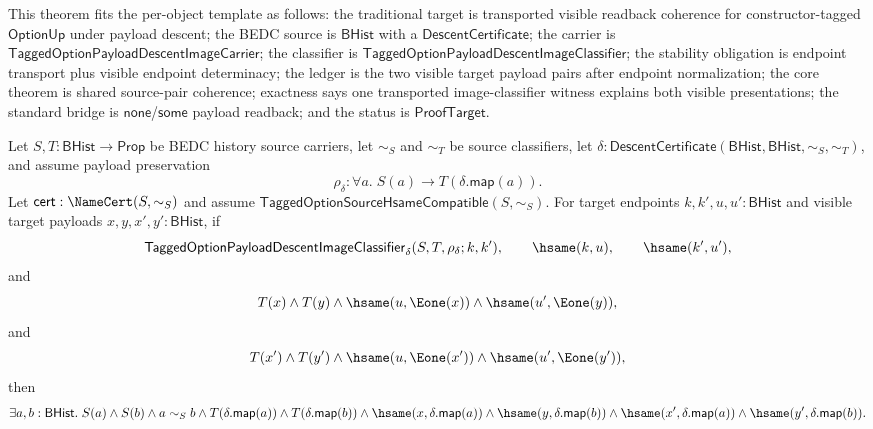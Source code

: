 \begin{theorem}
\label{thm:tagged-option-payload-descent-image-classifier-transported-visible-payload-pair-coherence}
This theorem fits the per-object template as follows: the traditional target is
transported visible readback coherence for constructor-tagged
$\mathsf{OptionUp}$ under payload descent; the BEDC source is $\mathsf{BHist}$
with a $\mathsf{DescentCertificate}$; the carrier is
$\mathsf{TaggedOptionPayloadDescentImageCarrier}$; the classifier is
$\mathsf{TaggedOptionPayloadDescentImageClassifier}$; the stability obligation
is endpoint transport plus visible endpoint determinacy; the ledger is the two
visible target payload pairs after endpoint normalization; the core theorem is
shared source-pair coherence; exactness says one transported image-classifier
witness explains both visible presentations; the standard bridge is
$\mathsf{none}$/$\mathsf{some}$ payload readback; and the status is
$\mathsf{ProofTarget}$.

Let $S,T:\mathsf{BHist}\to\mathsf{Prop}$ be BEDC history source carriers, let
$\sim_S$ and $\sim_T$ be source classifiers, let
$\delta:\mathsf{DescentCertificate}(\mathsf{BHist},\mathsf{BHist},\sim_S,\sim_T)$,
and assume payload preservation
$$
\rho_{\delta}:\forall a.\;S(a)\to T(\delta.\mathsf{map}(a)).
$$
Let $\mathsf{cert}:\NameCert(S,\sim_S)$ and assume
$\mathsf{TaggedOptionSourceHsameCompatible}(S,\sim_S)$. For target endpoints
$k,k',u,u':\mathsf{BHist}$ and visible target payloads
$x,y,x',y':\mathsf{BHist}$, if
$$
\mathsf{TaggedOptionPayloadDescentImageClassifier}_{\delta}
(S,T,\rho_{\delta};k,k'),
\qquad
\hsame(k,u),
\qquad
\hsame(k',u'),
$$
and
$$
T(x)\land T(y)\land
\hsame(u,\Eone(x))\land
\hsame(u',\Eone(y)),
$$
and
$$
T(x')\land T(y')\land
\hsame(u,\Eone(x'))\land
\hsame(u',\Eone(y')),
$$
then
$$
\exists a,b:\mathsf{BHist}.\;
S(a)\land S(b)\land a\sim_S b\land
T(\delta.\mathsf{map}(a))\land T(\delta.\mathsf{map}(b))\land
\hsame(x,\delta.\mathsf{map}(a))\land
\hsame(y,\delta.\mathsf{map}(b))\land
\hsame(x',\delta.\mathsf{map}(a))\land
\hsame(y',\delta.\mathsf{map}(b)).
$$
\end{theorem}

